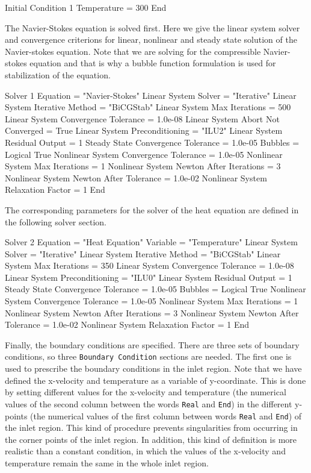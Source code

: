 \begin{flushleft}
\ttbegin
Initial Condition 1
  Temperature = 300
End
\ttend

The Navier-Stokes equation is solved first. Here we give the linear system solver and convergence criterions for linear, nonlinear and steady state solution of the Navier-stokes equation. Note that we are solving for the compressible Navier-stokes equation and that is why a bubble function formulation is used for stabilization of the equation.


\ttbegin
Solver 1
  Equation = "Navier-Stokes"
  Linear System Solver = "Iterative"
  Linear System Iterative Method = "BiCGStab"
  Linear System Max Iterations = 500
  Linear System Convergence Tolerance = 1.0e-08
  Linear System Abort Not Converged = True
  Linear System Preconditioning = "ILU2"
  Linear System Residual Output = 1
  Steady State Convergence Tolerance = 1.0e-05
  Bubbles = Logical True
  Nonlinear System Convergence Tolerance = 1.0e-05
  Nonlinear System Max Iterations = 1
  Nonlinear System Newton After Iterations = 3
  Nonlinear System Newton After Tolerance = 1.0e-02
  Nonlinear System Relaxation Factor = 1
End
\ttend

The corresponding parameters for the solver of the heat equation are defined in the following solver section.

\ttbegin
Solver 2
  Equation = "Heat Equation"
  Variable = "Temperature"
  Linear System Solver = "Iterative"
  Linear System Iterative Method = "BiCGStab"
  Linear System Max Iterations = 350
  Linear System Convergence Tolerance = 1.0e-08
  Linear System Preconditioning = "ILU0"
  Linear System Residual Output = 1
  Steady State Convergence Tolerance = 1.0e-05
  Bubbles = Logical True
  Nonlinear System Convergence Tolerance = 1.0e-05
  Nonlinear System Max Iterations = 1
  Nonlinear System Newton After Iterations = 3
  Nonlinear System Newton After Tolerance = 1.0e-02
  Nonlinear System Relaxation Factor = 1
End
\ttend

Finally, the boundary conditions are specified. There are three sets of boundary conditions, so three {\tt Boundary Condition} sections are needed. The first one is used to prescribe the boundary conditions in the inlet region. Note that we have defined the x-velocity and temperature as a variable of y-coordinate. 
This is done by setting different values for the x-velocity and temperature 
(the numerical values of the second column between the words {\tt Real} and {\tt End})
in the different y-points
(the numerical values of the first column between words {\tt Real} and {\tt End})
of the inlet region.
This kind of procedure prevents singularities from occurring in the corner points of the inlet region. In addition, this kind of definition is more realistic than a constant condition, in which the values of the x-velocity and temperature remain the same in the whole inlet region. 


\end{flushleft}
